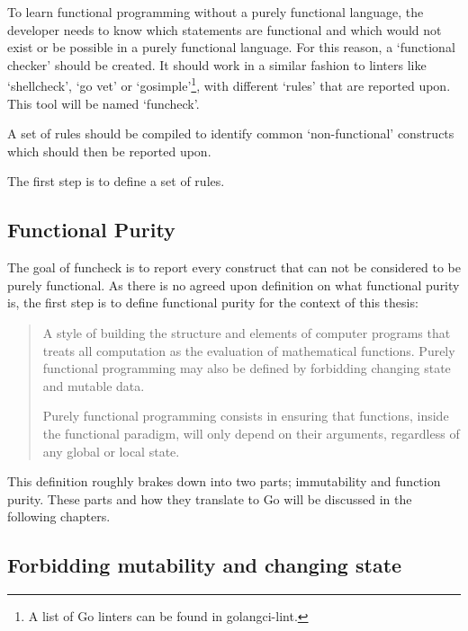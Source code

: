 To learn functional programming without a purely functional language, the
developer needs to know which statements are functional and which
would not exist or be possible in a purely functional language.
For this reason, a `functional checker' should be created. It should work
in a similar fashion to linters like `shellcheck', `go vet' or `gosimple'\footnote{
    A list of Go linters can be found in golangci-lint\autocite{golangci-lint}.
}, with different `rules' that are reported upon. This tool will be named `funcheck'.

A set of rules should be compiled to identify common `non-functional' constructs
which should then be reported upon.

The first step is to define a set of rules.

\subsection{Functional Purity}\label{sec:func-purity}

The goal of funcheck is to report every construct that can not be considered
to be purely functional. As there is no agreed upon definition on what
functional purity is\autocite{functional-controversy}, the first step is to
define functional purity for the context of this thesis:

\begin{quote}
    A style of building the structure and elements of computer programs that
    treats all computation as the evaluation of mathematical functions. Purely
    functional programming may also be defined by forbidding changing state and
    mutable data.

    Purely functional programming consists in ensuring that functions, inside
    the functional paradigm, will only depend on their arguments, regardless of
    any global or local state.\autocite{functional-purity-wiki}
\end{quote}

This definition roughly brakes down into two parts; immutability and function
purity. These parts and how they translate to Go will be discussed in the
following chapters.

\subsection{Forbidding mutability and changing state}\label{sec:mutability}


